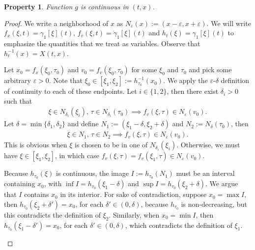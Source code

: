 \documentclass[a4paper]{article}
\theoremstyle{definition}
\theoremstyle{plain}
\newtheorem{property}{Property\hspace{0.25em}\ignorespaces}
\begin{document}
\begin{property}
  Function $g$ is continuous in $(t, x)$.
\end{property}
\begin{proof}
  We write a neighborhood of $x$ as
  $N_{\varepsilon}(x) := (x - \varepsilon, x + \varepsilon)$. We will write
  $f_{x}(\xi, t) = \gamma_{1}[\xi](t)$,
  $f_{v}(\xi, t) = \dot{\gamma}_{1}[\xi](t)$ and
  $h_{t}(\xi) = \gamma_{1}[\xi](t)$ to emphasize the quantities that we treat as
  variables. Observe that $h_{t}^{-1}(x) = X(t, x)$.

\begin{outline}
  \1 Let $x_{0} = f_{x}(\xi_{0}, \tau_{0})$ and $v_{0} = f_{v}(\xi_{0}, \tau_{0})$ for
  some $\xi_{0}$ and $\tau_{0}$ and pick some arbitrary $\varepsilon > 0$. Note that
  $\xi_{0} \in [\xi_{1}, \xi_{2}] := h_{\tau_{0}}^{-1}(x_{0})$.
  We apply the $\varepsilon$-$\delta$ definition of continuity to each of these endpoints. Let
  $i \in \{1, 2\}$, then there exist $\delta_{i} > 0$ such that
  \begin{align*}
  \xi \in N_{\delta_{i}}(\xi_{i}),\, \tau \in N_{\delta_{i}}(\tau_{0}) \implies
  f_{v}(\xi, \tau) \in N_{\varepsilon}(v_{0}).
  \end{align*}
  Let $\delta = \min\{ \delta_{1}, \delta_{2} \}$ and define $N_{1} := (\xi_{1} - \delta, \xi_{2} + \delta)$
  and $N_{2} := N_{\delta}(\tau_{0})$, then
  \begin{align*}
  \xi \in N_{1},\, \tau \in N_{2} \implies f_{v}(\xi, \tau) \in N_{\varepsilon}(v_{0}) .
  \end{align*}
  This is obvious when $\xi$
  is chosen to be in one of $N_{\delta_{i}}(\xi_{i})$. Otherwise, we must have $\xi \in [\xi_{1}, \xi_{2}]$,
  in which case $f_{v}(\xi, \tau) = f_{v}(\xi_{1}, \tau) \in N_{\varepsilon}(v_{0})$.

  \1 Because $h_{\tau_{0}}(\xi)$ is continuous, the image $I := h_{\tau_{0}}(N_{1})$
  must be an interval containing $x_{0}$, with
  $\inf I = h_{\tau_{0}}(\xi_{1} - \delta)$ and
  $\sup I = h_{\tau_{0}}(\xi_{2} + \delta)$.
  We argue that $I$ contains $x_{0}$ in its interior. For sake of
  contradiction, suppose $x_{0} = \max I$, then $h_{\tau_{0}}(\xi_{2} + \delta') = x_{0}$,
  for each $\delta' \in (0, \delta)$, because $h_{\tau_{0}}$ is non-decreasing, but this
  contradicts the definition of $\xi_{2}$. Similarly, when $x_{0} = \min I$, then
  $h_{\tau_{0}}(\xi_{1} - \delta') = x_{0}$, for each $\delta' \in (0, \delta)$, which contradicts the
  definition of $\xi_{1}$.


\end{outline}
\end{proof}
\end{document}
